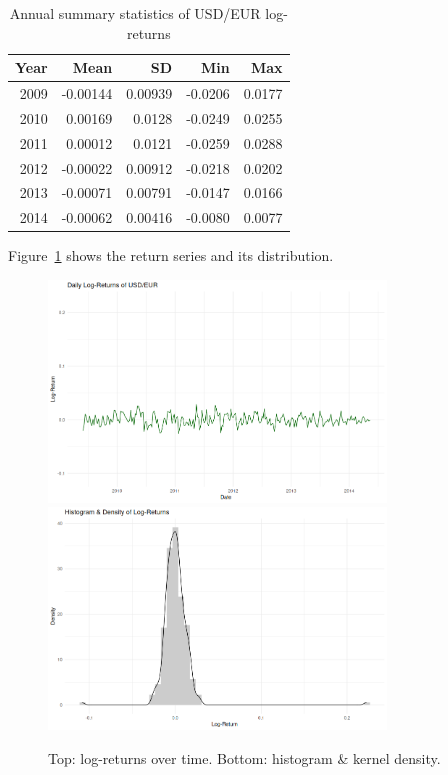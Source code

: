 \documentclass[11pt,a4paper]{article}
\begin{document}
    \begin{table}[H]
    \centering
    \caption{Annual summary statistics of USD/EUR log-returns}
    \label{tab:return_stats}
    \small
    \begin{tabular}{rrrrr}
        \toprule
        Year & Mean & SD & Min & Max \\ 
        \midrule
        2009 & -0.00144 & 0.00939 & -0.0206 &  0.0177 \\ 
        2010 &  0.00169 & 0.0128  & -0.0249 &  0.0255 \\ 
        2011 &  0.00012 & 0.0121  & -0.0259 &  0.0288 \\ 
        2012 & -0.00022 & 0.00912 & -0.0218 &  0.0202 \\ 
        2013 & -0.00071 & 0.00791 & -0.0147 &  0.0166 \\ 
        2014 & -0.00062 & 0.00416 & -0.0080 &  0.0077 \\ 
        \bottomrule
    \end{tabular}
    \end{table}

    Figure~\ref{fig:returns} shows the return series and its distribution.

    \begin{figure}[H]
    \centering
    \includegraphics[width=0.8\textwidth]{figures/usdeur_returns_timeseries.png}
    \includegraphics[width=0.8\textwidth]{figures/usdeur_returns_hist.png}
    \caption{Top: log-returns over time.  Bottom: histogram \& kernel density.}
    \label{fig:returns}
    \end{figure}
\end{document}
